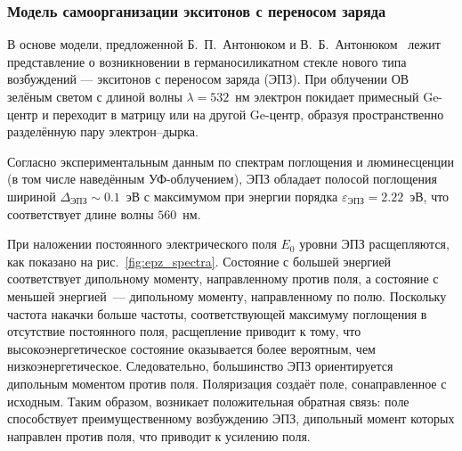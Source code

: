 \subsubsection{Модель самоорганизации экситонов с переносом заряда}\label{subsubsec:antonyuk}
В основе модели, предложенной Б.~П.~Антонюком и В.~Б.~Антонюком~\cite{antonyuk2001self} лежит представление о возникновении в германосиликатном стекле нового типа возбуждений --- экситонов с переносом заряда (ЭПЗ). При облучении ОВ зелёным светом с длиной волны $\lambda = 532$~нм электрон покидает примесный Ge-центр и переходит в матрицу или на другой Ge-центр, образуя пространственно разделённую пару электрон--дырка.

Согласно экспериментальным данным по спектрам поглощения и люминесценции (в том числе наведённым УФ-облучением), ЭПЗ обладает полосой поглощения шириной $\Delta_{\text{ЭПЗ}}\sim 0.1$~эВ с максимумом при энергии порядка $\varepsilon_{\text{ЭПЗ}}=2.22$~эВ, что соответствует длине волны $560$~нм.

При наложении постоянного электрического поля $E_0$ уровни ЭПЗ расщепляются, как показано на рис.~\ref{fig:epz_spectra}. Состояние с большей энергией соответствует дипольному моменту, направленному против поля, а состояние с меньшей энергией~--- дипольному моменту, направленному по полю. Поскольку частота накачки больше частоты, соответствующей максимуму поглощения в отсутствие постоянного поля, расщепление приводит к тому, что высокоэнергетическое состояние оказывается более вероятным, чем низкоэнергетическое. Следовательно, большинство ЭПЗ ориентируется дипольным моментом против поля. Поляризация создаёт поле, сонаправленное с исходным. Таким образом, возникает положительная обратная связь: поле способствует преимущественному возбуждению ЭПЗ, дипольный момент которых направлен против поля, что приводит к усилению поля.



